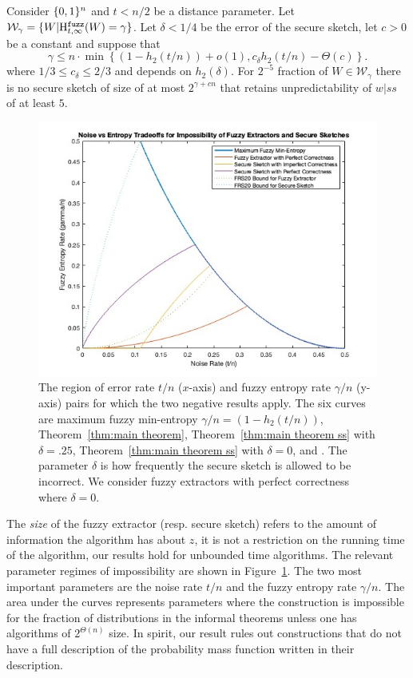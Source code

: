 \begin{theorem}
Consider $\{0, 1\}^n$ and $t< n/2$ be a distance parameter.  Let $\mathcal{W}_\gamma=\{W | \mathrm{H}^{\mathtt{fuzz}}_{t,\infty}(W) = \gamma\}$.  Let $\delta<1/4$ be the error of the secure sketch, let $c>0$ be a constant and suppose that \[
\gamma \le n\cdot\min\left\{(1-h_2(t/n)) +o(1), c_\delta h_2(t/n)-\Theta(c)\right\}.
\]
where $1/3\le  c_\delta \le 2/3$ and depends on $h_2(\delta)$. 
 For $2^{-5}$ fraction of $W \in \mathcal{W}_\gamma$ there is no secure sketch of
size of at most $2^{\gamma+cn}$ that
 retains unpredictability of $w|ss$ of at  least $5$.
\end{theorem}

\begin{figure}[t]
\centering
\includegraphics[width=.9\textwidth]{EntropyvsError.jpg}
\caption{The region of error rate $t/n$ ($x$-axis) and fuzzy entropy rate $\gamma/n$ (y-axis) pairs for which the two negative results apply.  The six curves are maximum fuzzy min-entropy $\gamma/n = (1-h_2(t/n))$, Theorem~\ref{thm:main theorem}, Theorem~\ref{thm:main theorem ss} with $\delta=.25$,  Theorem~\ref{thm:main theorem ss} with $\delta =0$, \cite[Theorem 5.1]{fuller2020fuzzy} and \cite[Theorem 7.2]{fuller2020fuzzy}. The parameter $\delta$ is how frequently the secure sketch is allowed to be incorrect.  We consider fuzzy extractors with perfect correctness where $\delta=0$.}
\label{fig:param regime}
\end{figure}
The \emph{size} of the fuzzy extractor (resp. secure sketch) refers to the amount of information the algorithm has about $z$, it is not a restriction on the running time of the algorithm, our results hold for unbounded time algorithms. 
 The relevant parameter regimes of impossibility are shown in Figure~\ref{fig:param regime}.  The two most important parameters are the noise rate $t/n$ and the fuzzy entropy rate $\gamma/n$. The area under the curves represents parameters where the construction is impossible for the fraction of distributions in the informal theorems unless one has algorithms of $2^{\Theta(n)}$ size.
In spirit, our result rules out constructions that do not have a full description of the probability mass function written in their description.  

